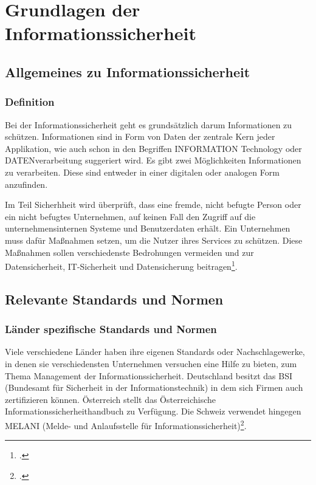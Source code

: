\chapter{Grundlagen der Informationssicherheit}
\strahlhofer

\section{Allgemeines zu Informationssicherheit} 
\subsection{Definition}
Bei der Informationssicherheit geht es grundsätzlich darum Informationen zu schützen. Informationen sind in Form von Daten der zentrale Kern jeder Applikation, wie auch schon in den Begriffen INFORMATION Technology oder DATENverarbeitung suggeriert wird. Es gibt zwei Möglichkeiten Informationen zu verarbeiten. Diese sind entweder in einer digitalen oder analogen Form anzufinden.

Im Teil Sicherhheit wird überprüft, dass eine fremde, nicht befugte Person oder ein nicht befugtes Unternehmen, auf keinen Fall den Zugriff auf die unternehmensinternen Systeme und Benutzerdaten erhält. Ein Unternehmen muss dafür Maßnahmen setzen, um die Nutzer ihres Services zu schützen. Diese Maßnahmen sollen verschiedenste Bedrohungen vermeiden und zur Datensicherheit, IT-Sicherheit und Datensicherung beitragen\footcite{Lehrunterlagen-HTL-cloud}.

\section{Relevante Standards und Normen}
\subsection{Länder spezifische Standards und Normen}
Viele verschiedene Länder haben ihre eigenen Standards oder Nachschlagewerke, in denen sie verschiedensten Unternehmen versuchen eine Hilfe zu bieten, zum Thema Management der Informationssicherheit.
Deutschland besitzt das BSI (Bundesamt für Sicherheit in der Informationstechnik) in dem sich Firmen auch zertifizieren können. Österreich stellt das Österreichische Informationssicherheithandbuch zu Verfügung. Die Schweiz verwendet hingegen MELANI (Melde- und Anlaufsstelle für Informationssicherheit)\footcite{Lehrunterlagen-HTL-cloud}.

